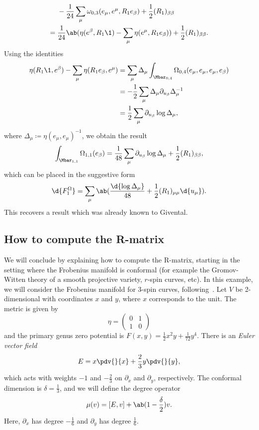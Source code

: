 \begin{exm}
\begin{align*}
        &-\frac{1}{24} \sum_{\mu} \omega_{0,3}(e_{\mu}, e^{\mu}, R_1 e_{\beta}) + \frac{1}{2} (R_1)_{\beta\beta} \\
        ={}& \frac{1}{24} \ab(\eta(e^{\beta}, R_1 \1) - \sum_{\mu} \eta(e^{\mu}, R_1 e_{\beta})) + \frac{1}{2} (R_1)_{\beta\beta}.
    \end{align*}
    Using the identities
    \begin{align*}
        \eta(R_1 \1, e^{\beta}) - \sum_{\mu} \eta(R_1 e_{\beta}, e^{\mu}) &= \sum_{\mu} \Delta_{\mu} \int_{\Mbar_{0,4}} \Omega_{0,4}(e_{\mu}, e_{\mu}, e_{\mu}, e_{\beta}) \\
        &= -\frac{1}{2}\sum_{\mu} \Delta_{\mu} \partial_{u_{\beta}} \Delta_{\mu}^{-1} \\
        &= \frac{1}{2} \sum_{\mu} \partial_{u_{\beta}} \log \Delta_{\mu},
    \end{align*}
    where $\Delta_{\mu} \coloneqq \eta(e_{\mu}, e_{\mu})^{-1}$, we obtain the result
    \[ \int_{\Mbar_{1,1}} \Omega_{1,1}(e_{\beta}) = \frac{1}{48} \sum_{\mu} \partial_{u_{\beta}} \log \Delta_{\mu} + \frac{1}{2} (R_1)_{\beta\beta}, \]
    which can be placed in the suggestive form
    \[ \d{F_1^{\Omega}} = \sum_{\mu} \ab( \frac{\d{\log \Delta_{\mu}}}{48} + \frac{1}{2} (R_1)_{\mu\mu} \d{u_{\mu}} ). \]
    This recovers a result which was already known to Givental.
\end{exm}

\subsection{How to compute the R-matrix}%
\label{sub:How to compute the R-matrix}

We will conclude by explaining how to compute the R-matrix, starting in the setting where the Frobenius manifold is conformal (for example the Gromov-Witten theory of a smooth projective variety, \(r\)-spin curves, etc). In this example, we will consider the Frobenius manifold for 3-spin curves, following~\cite{PPZ2015}. Let \(V\) be 2-dimensional with coordinates \(x\) and \(y\), where \(x\) corresponds to the unit. The metric is given by
\[ \eta = \begin{pmatrix}
    0 & 1 \\
    1 & 0
\end{pmatrix} \]
and the primary genus zero potential is \(F(x,y) = \frac{1}{2} x^2 y + \frac{1}{72} y^4\). There is an \textit{Euler vector field}
\[ E = x \pdv{}{x} + \frac{2}{3} y \pdv{}{y}, \]
which acts with weights \(-1\) and \(-\frac{2}{3}\) on \(\partial_x\) and \(\partial_y\), respectively. The conformal dimension is \(\delta = \frac{1}{3}\), and we will define the degree operator
\[ \mu(v) = [E,v] + \ab(1 - \frac{\delta}{2})v. \]
Here, \(\partial_x\) has degree \(-\frac{1}{6}\) and \(\partial_y\) has degree \(\frac{1}{6}\).

